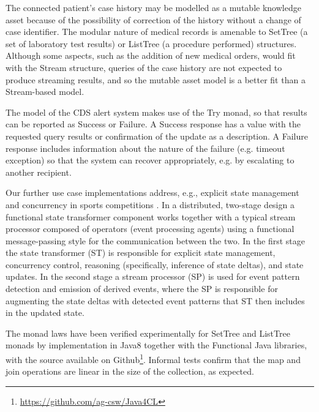 \documentclass[runningheads]{llncs}
\begin{document}
The connected patient's case history may be modelled as a mutable knowledge asset  because of the possibility of correction of the history without a change of case identifier. The modular nature of medical records is amenable to SetTree (a set of laboratory test results) or ListTree (a procedure performed) structures. Although some aspects, such as the addition of new medical orders, would fit with the Stream structure, queries of the case history are not expected to produce streaming results, and so the mutable asset model is a better fit than a Stream-based model.

The model of the CDS alert system makes use of the Try monad, so that results can be reported as Success or Failure. A Success response has a value with the requested query results or confirmation of the update as a description. A Failure response includes information about the nature of the failure (e.g. timeout exception) so that the system can recover appropriately, e.g. by escalating to another recipient.


Our further use case implementations address, e.g., explicit state management and concurrency in sports competitions \cite{JefferyKP09}. In a distributed, two-stage design a functional state transformer component works together with a typical stream processor composed of operators (event processing agents) using a functional message-passing style for the communication between the two. In the first stage the state transformer (ST) is responsible for explicit state management, concurrency control, reasoning (specifically, inference of state deltas), and state updates. In the second stage a stream processor (SP) is used for event pattern detection and emission of derived events, where the SP is responsible for augmenting the state deltas with detected event patterns that ST then includes in the updated state. 


The monad laws have been verified experimentally for SetTree and ListTree monads by implementation in Java8 together with the Functional Java libraries, with the source available on Github\footnote{\url{https://github.com/ag-csw/Java4CL}}. Informal tests confirm that the map and join operations are linear in the size of the collection, as expected.
\end{document}
